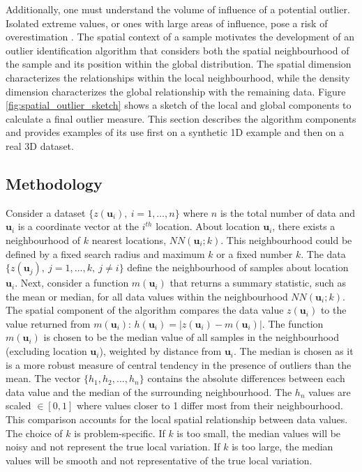 Additionally, one must understand the volume of influence of a potential outlier. Isolated extreme values, or ones with large areas of influence, pose a risk of overestimation \citep{leuangthong2015dealing}. The spatial context of a sample motivates the development of an outlier identification algorithm that considers both the spatial neighbourhood of the sample and its position within the global distribution. The spatial dimension characterizes the relationships within the local neighbourhood, while the density dimension characterizes the global relationship with the remaining data. Figure \ref{fig:spatial_outlier_sketch} shows a sketch of the local and global components to calculate a final outlier measure. This section describes the algorithm components and provides examples of its use first on a synthetic \gls{1D} example and then on a real \gls{3D} dataset.

\subsection{Methodology}
\label{subsec:02methodology}


Consider a dataset $\{z(\mathbf{u}_{i}), \ i = 1, \dots, n\}$ where $n$ is the total number of data and $\mathbf{u}_{i}$ is a coordinate vector at the $i^{th}$ location. About location $\mathbf{u}_{i}$, there exists a neighbourhood of $k$ nearest locations, $NN(\mathbf{u}_{i}; k)$. This neighbourhood could be defined by a fixed search radius and maximum $k$ or a fixed number $k$. The data $\{z(\mathbf{u}_{j}), \ j = 1, \dots, k, \ j \neq i \}$ define the neighbourhood of samples about location $\mathbf{u}_{i}$. Next, consider a function $m(\mathbf{u}_{i})$ that returns a summary statistic, such as the mean or median, for all data values within the neighbourhood $NN(\mathbf{u}_{i}; k)$. The spatial component of the algorithm compares the data value $z(\mathbf{u}_{i})$ to the value returned from $m(\mathbf{u}_{i})$: $h(\mathbf{u}_{i}) = |z(\mathbf{u}_{i}) - m(\mathbf{u}_{i})|$. The function $m(\mathbf{u}_{i})$ is chosen to be the median value of all samples in the neighbourhood (excluding location $\mathbf{u}_{i}$), weighted by distance from $\mathbf{u}_{i}$. The median is chosen as it is a more robust measure of central tendency in the presence of outliers than the mean. The vector $\{h_{1}, h_{2}, \dots, h_{n}\}$ contains the absolute differences between each data value and the median of the surrounding neighbourhood. The $h_{n}$ values are scaled $\in [0,1]$ where values closer to 1 differ most from their neighbourhood. This comparison accounts for the local spatial relationship between data values. The choice of $k$ is problem-specific. If $k$ is too small, the median values will be noisy and not represent the true local variation. If $k$ is too large, the median values will be smooth and not representative of the true local variation.

